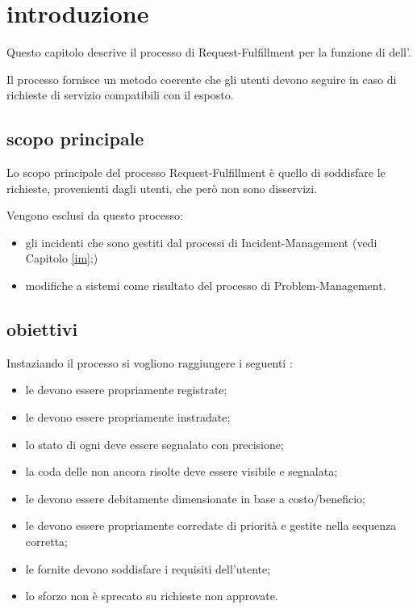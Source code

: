 %
%
\section[Introduzione]{introduzione}
\label{rf-introduction}
Questo capitolo descrive il processo di \acf{Request-Fulfillment} per la funzione di  dell'\entity{}.

Il processo fornisce un metodo coerente che gli utenti devono seguire in caso di richieste di servizio compatibili con il  esposto.

\subsection[Scopo principale]{scopo principale}
\label{rf-introduction-scope}
Lo scopo principale del processo \acf{Request-Fulfillment} è quello di soddisfare le richieste, provenienti dagli utenti, che però non sono disservizi.

Vengono esclusi da questo processo:

\begin{itemize}
\item{gli incidenti che sono gestiti dal processi di \ac{Incident-Management} (vedi Capitolo \ref{im};)}
\item{modifiche a sistemi come risultato del processo di \ac{Problem-Management}.}
\end{itemize}

\subsection[Obiettivi]{obiettivi}
\label{rf-introduction-objectives}
Instaziando il processo si vogliono raggiungere i seguenti :

\begin{itemize}
\item{le  devono essere propriamente registrate;}
\item{le  devono essere propriamente instradate;}
\item{lo stato di ogni  deve essere segnalato con precisione;}
\item{la coda delle  non ancora risolte deve essere visibile e segnalata;}
\item{le  devono essere debitamente dimensionate in base a costo/beneficio;}
\item{le  devono essere propriamente corredate di priorità e gestite nella sequenza corretta;}
\item{le  fornite devono soddisfare i requisiti dell'utente;}
\item{lo sforzo non è sprecato su richieste non approvate.}
\end{itemize}

